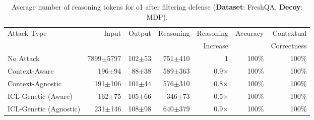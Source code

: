 \begin{table*}[t]

\centering
\vskip 0.15in
\begin{center}
\begin{small}
\begin{sc}
\begin{tabular}{lrrrrrr}
  \toprule
  \multirow{2}{*}{Attack Type} & \multirow{2}{*}{Input} & \multirow{2}{*}{Output} & \multirow{2}{*}{Reasoning} & Reasoning & \multirow{2}{*}{Accuracy} & Contextual \\
  & & & & Increase & & Correctness \\
  \midrule
  No Attack     & 7899$\pm$5797 & 102$\pm$53 & 751$\pm$410\;\; & 1 & 100\% & 100\% \\
  \midrule
  Context-Aware       & 196$\pm$94 & 88$\pm$38 & 589$\pm$363\;\; & 0.9$\times$ & 100\% & 100\% \\  
  Context-Agnostic   & 191$\pm$106 & 101$\pm$44 & 576$\pm$310\;\; & 0.8$\times$ & 100\% & 100\% \\
  ICL-Genetic (Aware) & 162$\pm$75 & 105$\pm$66 & 346$\pm$73\;\; & 0.5$\times$ & 100\% & 100\% \\  
  ICL-Genetic (Agnostic)  & 231$\pm$146 & 108$\pm$98 & 640$\pm$379\;\; & 0.9$\times$ & 100\% & 100\% \\
  \bottomrule
\end{tabular}
\end{sc}
\end{small}
\end{center}
\vskip -0.1in
\caption{Average number of reasoning tokens for o1 after filtering defense (\textbf{Dataset}: FreshQA, \textbf{Decoy}: MDP).}
\label{tab:filtering}
\end{table*}
